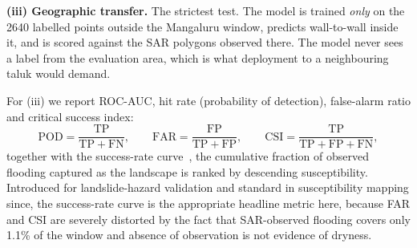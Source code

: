\documentclass[11pt,a4paper]{article}
\begin{document}
\textbf{(iii) Geographic transfer.} The strictest test. The model is trained
\emph{only} on the \num{2640} labelled points outside the Mangaluru window,
predicts wall-to-wall inside it, and is scored against the SAR polygons observed
there. The model never sees a label from the evaluation area, which is what
deployment to a neighbouring taluk would demand.

For (iii) we report ROC-AUC, hit rate (probability of detection),
false-alarm ratio and critical success index:
\begin{equation}
\mathrm{POD}=\frac{\mathrm{TP}}{\mathrm{TP}+\mathrm{FN}},\qquad
\mathrm{FAR}=\frac{\mathrm{FP}}{\mathrm{TP}+\mathrm{FP}},\qquad
\mathrm{CSI}=\frac{\mathrm{TP}}{\mathrm{TP}+\mathrm{FP}+\mathrm{FN}},
\label{eq:contingency}
\end{equation}
together with the success-rate curve~\citep{chung2003}, the cumulative fraction
of observed flooding captured as the landscape is ranked by descending
susceptibility. Introduced for landslide-hazard validation and standard in
susceptibility mapping since, the success-rate curve is the appropriate headline
metric here, because FAR and CSI
are severely distorted by the fact that SAR-observed flooding covers only 1.1\%
of the window and absence of observation is not evidence of dryness.
\end{document}
